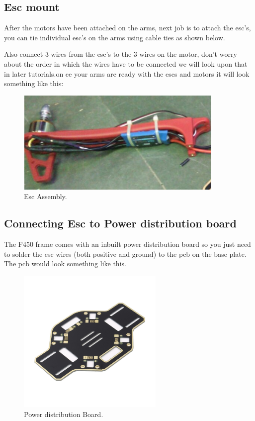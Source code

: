 \documentclass[11pt,a4paper]{article}
\begin{document}
	 	\subsection{Esc mount}
	 	After the motors have been attached on the arms, next job is to attach the esc's, you can tie individual esc's on the arms using cable ties as shown below.
		 	
	 	 Also connect 3 wires from the esc's to the 3 wires on the motor, don't worry about the order in which the wires have to be connected we will look upon that in later tutorials.on ce your arms are ready with the escs and motors it will look something like this:
	 	 \begin{figure}[h]
	 	
	 	\centering
		\includegraphics[width=10cm,height=5cm]{esc}
		\caption{Esc Assembly.}
		\end{figure}
		
		\subsection{Connecting Esc to Power distribution board}
		The F450 frame comes with an inbuilt power distribution board so you just need to solder the esc wires (both positive and ground) to the pcb on the base plate. The pcb would look something like this.
		\begin{figure}[h]
	 	
	 	\centering
		\includegraphics[width=7cm,height=7cm]{pcb}
		\caption{Power distribution Board.}
		\end{figure}
		
\end{document}
